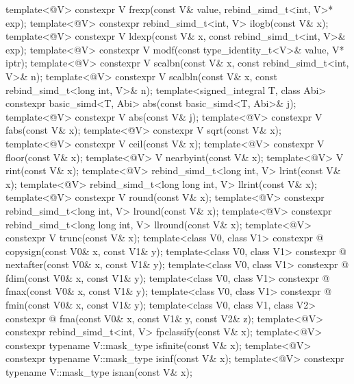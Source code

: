 \begin{itemdecl}
template<@\mathfloatingpoint@ V> constexpr V frexp(const V& value, rebind_simd_t<int, V>* exp);
template<@\mathfloatingpoint@ V> constexpr rebind_simd_t<int, V> ilogb(const V& x);
template<@\mathfloatingpoint@ V> constexpr V ldexp(const V& x, const rebind_simd_t<int, V>& exp);
template<@\mathfloatingpoint@ V> constexpr V modf(const type_identity_t<V>& value, V* iptr);
template<@\mathfloatingpoint@ V> constexpr V scalbn(const V& x, const rebind_simd_t<int, V>& n);
template<@\mathfloatingpoint@ V>
  constexpr V scalbln(const V& x, const rebind_simd_t<long int, V>& n);
template<signed_integral T, class Abi>
  constexpr basic_simd<T, Abi> abs(const basic_simd<T, Abi>& j);
template<@\mathfloatingpoint@ V> constexpr V abs(const V& j);
template<@\mathfloatingpoint@ V> constexpr V fabs(const V& x);
template<@\mathfloatingpoint@ V> constexpr V sqrt(const V& x);
template<@\mathfloatingpoint@ V> constexpr V ceil(const V& x);
template<@\mathfloatingpoint@ V> constexpr V floor(const V& x);
template<@\mathfloatingpoint@ V> V nearbyint(const V& x);
template<@\mathfloatingpoint@ V> V rint(const V& x);
template<@\mathfloatingpoint@ V> rebind_simd_t<long int, V> lrint(const V& x);
template<@\mathfloatingpoint@ V> rebind_simd_t<long long int, V> llrint(const V& x);
template<@\mathfloatingpoint@ V> constexpr V round(const V& x);
template<@\mathfloatingpoint@ V> constexpr rebind_simd_t<long int, V> lround(const V& x);
template<@\mathfloatingpoint@ V> constexpr rebind_simd_t<long long int, V> llround(const V& x);
template<@\mathfloatingpoint@ V> constexpr V trunc(const V& x);
template<class V0, class V1>
  constexpr @ copysign(const V0& x, const V1& y);
template<class V0, class V1>
  constexpr @ nextafter(const V0& x, const V1& y);
template<class V0, class V1>
  constexpr @ fdim(const V0& x, const V1& y);
template<class V0, class V1>
  constexpr @ fmax(const V0& x, const V1& y);
template<class V0, class V1>
  constexpr @ fmin(const V0& x, const V1& y);
template<class V0, class V1, class V2>
  constexpr @ fma(const V0& x, const V1& y, const V2& z);
template<@\mathfloatingpoint@ V> constexpr rebind_simd_t<int, V> fpclassify(const V& x);
template<@\mathfloatingpoint@ V> constexpr typename V::mask_type isfinite(const V& x);
template<@\mathfloatingpoint@ V> constexpr typename V::mask_type isinf(const V& x);
template<@\mathfloatingpoint@ V> constexpr typename V::mask_type isnan(const V& x);

\end{itemdecl}
